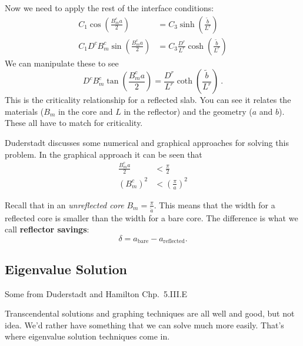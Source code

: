 \documentclass[12pt]{article}
\begin{document}
Now we need to apply the rest of the interface conditions:
\begin{align*}
C_1 \cos(\frac{B_m^c a}{2}) &= C_3 \sinh(\frac{\tilde{b}}{L^r})\\
C_1 D^c B_m^c \sin(\frac{B_m^c a}{2}) &= C_3 \frac{D^r}{L^r}\cosh(\frac{\tilde{b}}{L^r})
\end{align*}
We can manipulate these to see
\[
D^c B_m^c \tan(\frac{B_m^c a}{2}) = \frac{D^r}{L^r}\coth(\frac{\tilde{b}}{L^r})\:.
\]
This is the criticality relationship for a reflected slab. You can see it relates the materials ($B_m$ in the core and $L$ in the reflector) and the geometry ($a$ and $b$). These all have to match for criticality.

Duderstadt discusses some numerical and graphical approaches for solving this problem. In the graphical approach it can be seen that
\begin{align*}
\frac{B_m^c a}{2} &< \frac{\pi}{2}\\
(B_m^c)^2 &< (\frac{\pi}{a})^2
\end{align*}

Recall that in an \textit{unreflected core} $B_m = \frac{\pi}{\tilde{a}}$. This means that the width for a reflected core is smaller than the width for a bare core. The difference is what we call \textbf{reflector savings}:
\[
\delta = a_{\text{bare}} - a_{\text{reflected}}.
\]

\subsection*{Eigenvalue Solution}
Some from Duderstadt and Hamilton Chp.\ 5.III.E 

Transcendental solutions and graphing techniques are all well and good, but not idea. We'd rather have something that we can solve much more easily. That's where eigenvalue solution techniques come in. 
\end{document}
